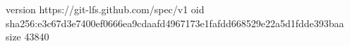 version https://git-lfs.github.com/spec/v1
oid sha256:e3c67d3e7400ef0666ea9cdaafd4967173e1fafdd668529e22a5d1fdde393baa
size 43840
